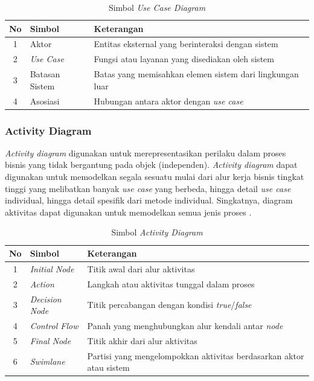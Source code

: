 \begin{table}[H]
\centering
\caption{Simbol \textit{Use Case Diagram}}
\label{tab:simbol-usecase}
\begin{tabular}{|c|l|p{7cm}|}
\hline
\textbf{No} & \textbf{Simbol} & \textbf{Keterangan} \\
\hline
1 & Aktor & Entitas eksternal yang berinteraksi dengan sistem \\
\hline
2 & \textit{Use Case} & Fungsi atau layanan yang disediakan oleh sistem \\
\hline
3 & Batasan Sistem & Batas yang memisahkan elemen sistem dari lingkungan luar \\
\hline
4 & Asosiasi & Hubungan antara aktor dengan \textit{use case} \\
\hline
\end{tabular}
\end{table}

\subsubsection{Activity Diagram}\label{activity-diagram}

\textit{Activity diagram} digunakan untuk merepresentasikan perilaku dalam proses bisnis yang tidak bergantung pada objek (independen). \textit{Activity diagram} dapat digunakan untuk memodelkan segala sesuatu mulai dari alur kerja bisnis tingkat tinggi yang melibatkan banyak \textit{use case} yang berbeda, hingga detail \textit{use case} individual, hingga detail spesifik dari metode individual. Singkatnya, diagram aktivitas dapat digunakan untuk memodelkan semua jenis proses \cite{dennis2020systems}.

\begin{table}[H]
\centering
\caption{Simbol \textit{Activity Diagram}}
\label{tab:simbol-activity}
\begin{tabular}{|c|l|p{7cm}|}
\hline
\textbf{No} & \textbf{Simbol} & \textbf{Keterangan} \\
\hline
1 & \textit{Initial Node} & Titik awal dari alur aktivitas \\
\hline
2 & \textit{Action} & Langkah atau aktivitas tunggal dalam proses \\
\hline
3 & \textit{Decision Node} & Titik percabangan dengan kondisi \textit{true}/\textit{false} \\
\hline
4 & \textit{Control Flow} & Panah yang menghubungkan alur kendali antar \textit{node} \\
\hline
5 & \textit{Final Node} & Titik akhir dari alur aktivitas \\
\hline
6 & \textit{Swimlane} & Partisi yang mengelompokkan aktivitas berdasarkan aktor atau sistem \\
\hline
\end{tabular}
\end{table}

